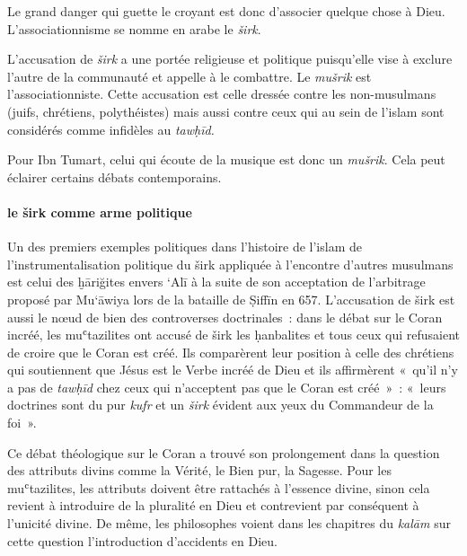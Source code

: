 \begin{Def}[širk]
Le grand danger qui guette le croyant est donc d'associer quelque chose
à Dieu. L'associationnisme se nomme en arabe le \emph{širk}.
\end{Def}

L'accusation de \emph{širk} a une portée religieuse et politique
puisqu'elle vise à exclure l'autre de la communauté et appelle à le
combattre. Le \emph{mušrik} est l'associationniste. Cette accusation est
celle dressée contre les non-musulmans (juifs, chrétiens, polythéistes)
mais aussi contre ceux qui au sein de l'islam sont considérés comme
infidèles au \emph{tawḥīd.}


Pour Ibn Tumart, celui qui écoute de la musique est donc un
\emph{mušrik}. Cela peut éclairer certains débats contemporains.

\paragraph{le širk comme arme politique}

Un des premiers exemples politiques dans l'histoire de l'islam de
l'instrumentalisation politique du širk appliquée à l'encontre d'autres
musulmans est celui des ḫāriğites envers `Alī à la suite de son
acceptation de l'arbitrage proposé par Mu`āwiya lors de la bataille de
Ṣiffīn en 657.
L'accusation de širk est aussi le nœud de bien des controverses
doctrinales~: dans le débat sur le Coran incréé, les muʿtazilites ont
accusé de širk les ḥanbalites et tous ceux qui refusaient de croire que
le Coran est créé. Ils comparèrent leur position à celle des chrétiens
qui soutiennent que Jésus est le Verbe incréé de Dieu et ils affirmèrent 
«~qu'il n'y a pas de \textit{tawḥīd} chez ceux qui n'acceptent pas que le Coran
est créé~»~: «~leurs doctrines sont du pur \textit{kufr} et un \textit{širk} évident aux
yeux du Commandeur de la foi~». 
  
  Ce débat
théologique sur le Coran a trouvé son prolongement dans la question des
attributs divins comme la Vérité, le Bien pur, la Sagesse. Pour les
muʿtazilites, les attributs doivent être rattachés à l'essence divine,
sinon cela revient à introduire de la pluralité en Dieu et contrevient
par conséquent à l'unicité divine. De même, les philosophes voient dans
les chapitres du \textit{kalām} sur cette question l'introduction d'accidents en
Dieu.


